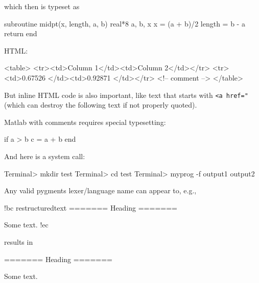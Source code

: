 \documentclass[%
oneside,                 %
final,                   %
10pt]{article}
\theoremstyle{definition}
\begin{document}
\edo

which then is typeset as








\bcod
      subroutine midpt(x, length, a, b)
      real*8 a, b, x
      x = (a + b)/2
      length = b - a
      return
      end

\ecod


HTML:







\bhtmlcod
<table>
<tr><td>Column 1</td><td>Column 2</td></tr>
<tr><td>0.67526 </td><td>0.92871 </td></tr>
<!-- comment -->
</table>

\ehtmlcod


But inline HTML code is also important, like text that starts with
\texttt{<a href="} (which can destroy the following text if not properly
quoted).

Matlab with comments requires special typesetting:







\bmcod
if a > b
  c = a + b
end

\emcod


And here is a system call:







\bsys
Terminal> mkdir test
Terminal> cd test
Terminal> myprog -f
output1
output2

\esys


Any valid pygments lexer/language name can appear to, e.g.,









\bdo
!bc restructuredtext
=======
Heading
=======

Some text.
!ec

\edo

results in







\brestructuredtext
=======
Heading
=======

Some text.
\end{document}
